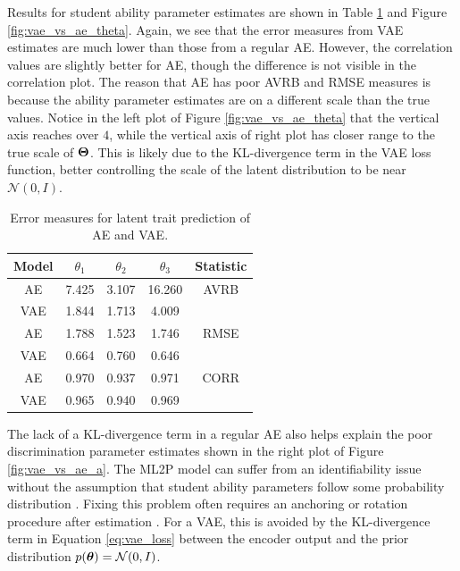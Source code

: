 Results for student ability parameter estimates are shown in Table \ref{tab:vae_vs_ae_theta} and Figure \ref{fig:vae_vs_ae_theta}. Again, we see that the error measures from VAE estimates are much lower than those from a regular AE. However, the correlation values are slightly better for AE, though the difference is not visible in the correlation plot. The reason that AE has poor AVRB and RMSE measures is because the ability parameter estimates are on a different scale than the true values. Notice in the left plot of Figure \ref{fig:vae_vs_ae_theta} that the vertical axis reaches over $4$, while the vertical axis of right plot has closer range to the true scale of $\boldsymbol{\Theta}$. This is likely due to the KL-divergence term in the VAE loss function, better controlling the scale of the latent distribution to be near $\mathcal{N}(0,I)$.

\begin{table}[h!]
\centering
\begin{tabular}{ccccc}
\hline
Model & $\theta_1$ & $\theta_2$ & $\theta_3$ & Statistic \\
\hline
AE &  7.425 & 3.107 & 16.260 & AVRB \\
VAE   & 1.844 & 1.713 & 4.009 &  \\
\hline
AE & 1.788 & 1.523 & 1.746 & RMSE \\
VAE   & 0.664 & 0.760 & 0.646 & \\
\hline
AE & 0.970 & 0.937 & 0.971 & CORR \\
VAE   & 0.965 & 0.940 & 0.969 & \\
\hline
\end{tabular}
\caption{Error measures for latent trait prediction of AE and VAE.}
\label{tab:vae_vs_ae_theta}
\end{table}

The lack of a KL-divergence term in a regular AE also helps explain the poor discrimination parameter estimates shown in the right plot of Figure \ref{fig:vae_vs_ae_a}. The ML2P model can suffer from an identifiability issue without the assumption that student ability parameters follow some probability distribution \cite{ets2005}. Fixing this problem often requires an anchoring or rotation procedure after estimation \cite{baker_kim2004}. For a VAE, this is avoided by the KL-divergence term in Equation \ref{eq:vae_loss} between the encoder output and the prior distribution $p(\boldsymbol{\theta}) = \mathcal{N}(0,I)$.

